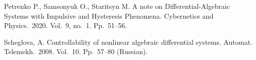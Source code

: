 \documentclass[12pt]{llncs}
\begin{document}
\begin{thebibliography}{9}



 Petrenko P., Samsonyuk O., Staritsyn M. A note on Differential-Algebraic Systems with Impulsive and Hysteresis Phenomena. Cybernetics  and Physics.~2020. Vol.~9, no.~1. Pp.~51--56.

 Scheglova, A. Controllability of nonlinear algebraic differential systems. Automat. Telemekh.~2008. Vol.~10. Pp.~57--80 (Russian).

 






\end{thebibliography}



\end{document}
